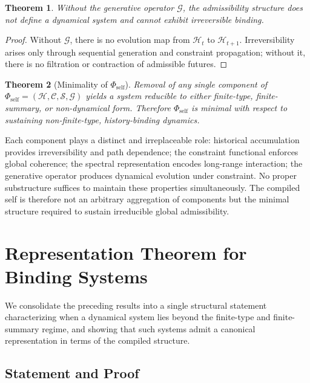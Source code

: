 \documentclass[12pt, a4paper]{article}
\theoremstyle{plain}
\newtheorem{theorem}{Theorem}[section]
\theoremstyle{definition}
\theoremstyle{remark}
\begin{document}
\begin{theorem}
Without the generative operator $\mathcal{G}$, the admissibility structure does not define a dynamical system and cannot exhibit irreversible binding.
\end{theorem}

\begin{proof}
Without $\mathcal{G}$, there is no evolution map from $\mathcal{H}_t$ to $\mathcal{H}_{t+1}$. Irreversibility arises only through sequential generation and constraint propagation; without it, there is no filtration or contraction of admissible futures.
\end{proof}

\begin{theorem}[Minimality of $\Phi_{\mathrm{self}}$]
Removal of any single component of $\Phi_{\mathrm{self}} = (\mathcal{H}, \mathcal{C}, \mathcal{S}, \mathcal{G})$ yields a system reducible to either finite-type, finite-summary, or non-dynamical form. Therefore $\Phi_{\mathrm{self}}$ is minimal with respect to sustaining non-finite-type, history-binding dynamics.
\end{theorem}

Each component plays a distinct and irreplaceable role: historical accumulation provides irreversibility and path dependence; the constraint functional enforces global coherence; the spectral representation encodes long-range interaction; the generative operator produces dynamical evolution under constraint. No proper substructure suffices to maintain these properties simultaneously. The compiled self is therefore not an arbitrary aggregation of components but the minimal structure required to sustain irreducible global admissibility.

\section{Representation Theorem for Binding Systems}

We consolidate the preceding results into a single structural statement characterizing when a dynamical system lies beyond the finite-type and finite-summary regime, and showing that such systems admit a canonical representation in terms of the compiled structure.

\subsection{Statement and Proof}
\end{document}
